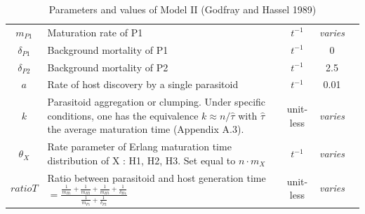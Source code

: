 \documentclass[12pt,a4paper,onecolumn]{article}
\begin{document}
\begin{table}[htb]
\begin{tabularx}{\linewidth}{c >{\raggedright\arraybackslash}X c c c}
$m_{P1}$ & Maturation rate of P1 & $t^{-1}$ & \textit{varies}  \\
$\delta_{P1}$ & Background mortality of P1 & $t^{-1}$ & 0   \\
$\delta_{P2}$ & Background mortality of P2 & $t^{-1}$ & 2.5   \\
$a$ & Rate of host discovery by a single parasitoid & $t^{-1}$ & 0.01   \\
$k$ & Parasitoid aggregation or clumping. Under specific conditions, one has the equivalence $k \approx n/\hat \tau$ with $\hat \tau$ the average maturation time (Appendix A.3). & unit-less & \textit{varies}   \\

$\theta_X$ & Rate parameter of Erlang maturation time distribution of X : H1, H2, H3. Set equal to $n \cdot m_{X}$ & $t^{-1}$ & \textit{varies}     \\

$\textit{ratioT}$ & Ratio between parasitoid and host generation time $= \frac{ \frac{1}{m_{H1}} + \frac{1}{m_{H2}}+ \frac{1}{m_{H3}} + \frac{1}{\delta_{H4}} }{\frac{1}{m_{P1}} + \frac{1}{\delta_{P2}} }$ & unit-less & \textit{varies}  \\

\bottomrule
\end{tabularx}
\caption{Parameters and values of Model II (Godfray and Hassel 1989)}
\end{table}
\end{document}
